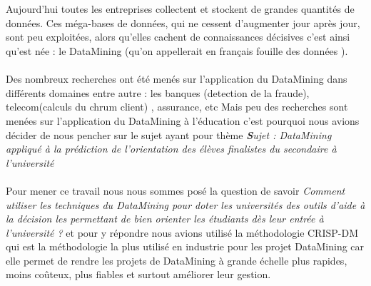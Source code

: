 \makeatletter
\renewenvironment{abstract}{%
	\if@twocolumn
	\section*{\abstractname}%
	\else %
	\begin{center}%
		{\bfseries\Large\textit {\abstractname}\vspace{\z@}}%
	\end{center}%
	\quotation
	\fi}
{\if@twocolumn\else\endquotation\fi}
\makeatother
{} 
\begin{abstract}
	\thispagestyle{plain} 
Aujourd'hui toutes les entreprises collectent et stockent de grandes quantités de données. Ces méga-bases de données, qui ne cessent d'augmenter jour après jour, sont peu exploitées, alors qu'elles cachent de connaissances décisives c'est ainsi qu'est   née : le DataMining   (qu'on appellerait en français fouille des données ).
\paragraph{}
Des nombreux recherches ont été menés  sur l'application du DataMining dans différents domaines entre autre : les banques (detection de la fraude), telecom(calculs du chrum client) , assurance, etc
Mais peu des recherches sont menées sur l'application du DataMining à l'éducation c'est pourquoi nous avions décider 
de nous pencher sur le sujet ayant pour thème \textit{ \textbf Sujet : DataMining appliqué à la prédiction de l'\textbf{}orientation des élèves finalistes du secondaire à l'université } 
\paragraph{}
Pour mener ce travail nous nous sommes posé la question de savoir \emph{Comment utiliser les techniques  du DataMining pour doter les universités des outils d'aide à la décision les permettant de bien orienter les étudiants dès leur entrée à l'université ?  } et pour y répondre nous avions utilisé la méthodologie \ac{CRISP-DM} qui est la méthodologie la plus utilisé en industrie pour les projet DataMining car elle permet de rendre les projets de DataMining à grande échelle plus rapides, moins coûteux, plus fiables et surtout améliorer leur gestion.

\end{abstract}
